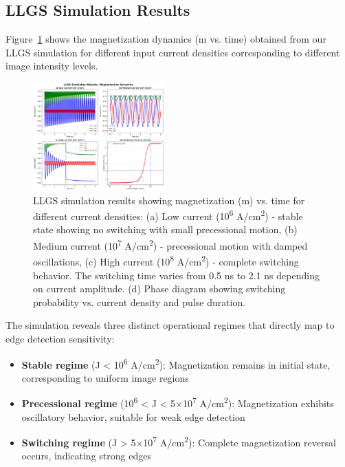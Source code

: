 \documentclass[conference]{IEEEtran}
\begin{document}
\subsection{LLGS Simulation Results}

Figure~\ref{fig:llgs_output} shows the magnetization dynamics (m vs. time) obtained from our LLGS simulation for different input current densities corresponding to different image intensity levels.

\begin{figure}[htbp]
\centerline{\includegraphics[width=0.45\textwidth]{llgs_simulation.png}}
\caption{LLGS simulation results showing magnetization (m) vs. time for different current densities: (a) Low current (10\textsuperscript{6} A/cm\textsuperscript{2}) - stable state showing no switching with small precessional motion, (b) Medium current (10\textsuperscript{7} A/cm\textsuperscript{2}) - precessional motion with damped oscillations, (c) High current (10\textsuperscript{8} A/cm\textsuperscript{2}) - complete switching behavior. The switching time varies from 0.5 ns to 2.1 ns depending on current amplitude. (d) Phase diagram showing switching probability vs. current density and pulse duration.}
\label{fig:llgs_output}
\end{figure}

The simulation reveals three distinct operational regimes that directly map to edge detection sensitivity:

\begin{itemize}
\item \textbf{Stable regime} (J < 10\textsuperscript{6} A/cm\textsuperscript{2}): Magnetization remains in initial state, corresponding to uniform image regions
\item \textbf{Precessional regime} (10\textsuperscript{6} < J < 5$\times$10\textsuperscript{7} A/cm\textsuperscript{2}): Magnetization exhibits oscillatory behavior, suitable for weak edge detection
\item \textbf{Switching regime} (J > 5$\times$10\textsuperscript{7} A/cm\textsuperscript{2}): Complete magnetization reversal occurs, indicating strong edges
\end{itemize}
\end{document}
